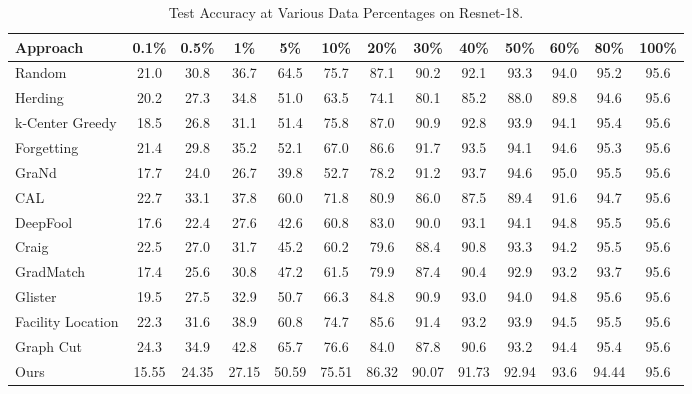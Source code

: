 \begin{table}[bt]
\centering
\caption{Test Accuracy at Various Data Percentages on Resnet-18.}
\label{tab:performance_data}
\begin{tabular}{lcccccccccccc}
 \toprule
 \textbf{Approach} &\textbf{0.1\%}& \textbf{0.5\%}&\textbf{1\%}& \textbf{5\%} & \textbf{10\%} & \textbf{20\%} & \textbf{30\%} & \textbf{40\%} & \textbf{50\%} & \textbf{60\%} & \textbf{80\%} & \textbf{100\%} \\
 \midrule
 Random & 21.0& 30.8& 36.7& 64.5& 75.7& 87.1& 90.2& 92.1& 93.3& 94.0& 95.2& 95.6 \\
 Herding & 20.2& 27.3& 34.8& 51.0& 63.5& 74.1& 80.1& 85.2& 88.0& 89.8& 94.6& 95.6 \\
 k-Center Greedy & 18.5& 26.8& 31.1& 51.4& 75.8& 87.0& 90.9& 92.8& 93.9& 94.1& 95.4& 95.6\\ 
 Forgetting & 21.4& 29.8& 35.2& 52.1& 67.0& 86.6& 91.7& 93.5& 94.1& 94.6& 95.3& 95.6\\
 GraNd & 17.7& 24.0 &26.7 &39.8& 52.7 & 78.2&  91.2 & 93.7 & 94.6 & 95.0 & 95.5 & 95.6 \\
 CAL & 22.7& 33.1& 37.8& 60.0& 71.8& 80.9& 86.0& 87.5& 89.4& 91.6& 94.7& 95.6 \\
 DeepFool & 17.6& 22.4& 27.6& 42.6& 60.8& 83.0& 90.0& 93.1& 94.1& 94.8& 95.5& 95.6 \\
 Craig & 22.5& 27.0& 31.7& 45.2& 60.2& 79.6& 88.4& 90.8& 93.3& 94.2& 95.5& 95.6\\
 GradMatch &17.4 &25.6 &30.8 &47.2 & 61.5 & 79.9 &87.4 & 90.4 & 92.9 & 93.2 & 93.7 &95.6\\
 Glister & 19.5& 27.5& 32.9& 50.7& 66.3& 84.8& 90.9& 93.0& 94.0& 94.8& 95.6& 95.6 \\
 Facility Location & 22.3& 31.6& 38.9& 60.8& 74.7& 85.6& 91.4& 93.2& 93.9& 94.5& 95.5& 95.6 \\
 Graph Cut & 24.3& 34.9& 42.8& 65.7& 76.6& 84.0& 87.8& 90.6& 93.2& 94.4& 95.4& 95.6\\
 Ours & 15.55 & 24.35 &   27.15 &   50.59 &   75.51 &   86.32 &   90.07 &   91.73 &  92.94 &  93.6 &  94.44 &  95.6\\
 \bottomrule
\end{tabular}
\end{table}
